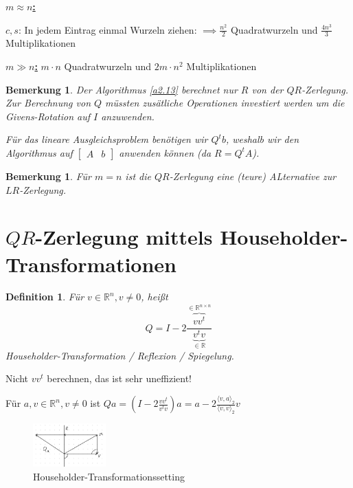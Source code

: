 \documentclass{book}
\newtheorem{definition}[algorithm]{Definition}
\newtheorem{remark}[algorithm]{Bemerkung}
\def\R{\mathbb{R}}
\begin{document}
        \underline{\textbf{$m\approx n$:}}
    
        $c,s$: In jedem Eintrag einmal Wurzeln ziehen: $\implies \frac{n^2}{2}$ Quadratwurzeln und $\frac{4n^3}{3}$ Multiplikationen

        \underline{\textbf{$m\gg n$:}} $m\cdot n$ Quadratwurzeln und $2m\cdot n^2$ Multiplikationen

        \begin{remark}\label{r2.14}
            Der Algorithmus \ref{a2.13} berechnet nur $R$ von der $QR$-Zerlegung. Zur Berechnung von $Q$ müssten 
            zusätliche Operationen investiert werden um die Givens-Rotation auf $I$ anzuwenden.

            Für das lineare Ausgleichsproblem benötigen wir $Q^tb$, weshalb wir den Algorithmus auf $\left[\begin{array}{c|c}
                A & b
            \end{array}\right]$ anwenden können (da $R=Q^t A$).
        \end{remark}

        \begin{remark}\label{b2.15}
            Für $m=n$ ist die $QR$-Zerlegung eine (teure) ALternative zur $LR$-Zerlegung.
        \end{remark}

    \section{$QR$-Zerlegung mittels Householder-Transformationen}

        \begin{definition}\label{d2.16}
            Für $v\in\R^n,v\neq 0$, heißt \[Q=I-2\frac{\overbrace{vv^t}^{\in\R^{n\times n}}}{\underbrace{v^tv}_{\in\R}}\]
            Householder-Transformation / Reflexion / Spiegelung.
        \end{definition}

        \begin{tcolorbox}[enhanced,breakable,
            title=Wichtig!]
            Nicht $vv^t$ berechnen, das ist sehr uneffizient!
        \end{tcolorbox}

        Für $a,v\in\R^n,v\neq 0$ ist $Qa=\left(I-2\frac{vv^t}{v^tv}\right)a =a-2\frac{\langle v,a \rangle_2}{\langle v,v \rangle_2}v$

        \begin{figure}[H]
            \centering
            \includegraphics[width=0.25\textwidth]{Bild009}
            \caption{Householder-Transformationssetting}
        \end{figure}
\end{document}
